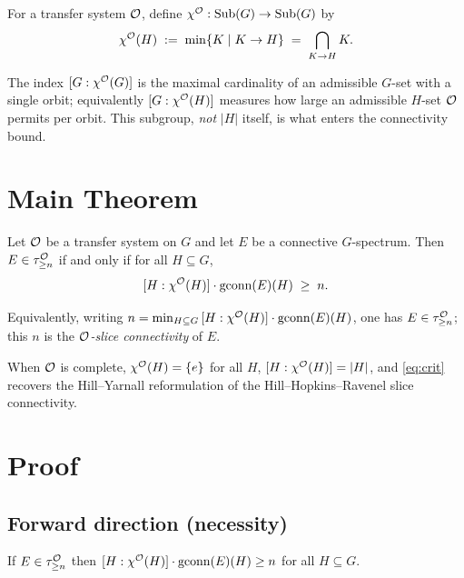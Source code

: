 \documentclass[11pt]{article}
\begin{document}
\begin{qfivedefinition}
For a transfer system $\mathcal{O}$, define $\chi^{\mathcal{O}}:\operatorname{Sub}(G)\to\operatorname{Sub}(G)$ by
\[
\chi^{\mathcal{O}}(H)\;:=\;\min\{K\mid K\to H\}\;=\;\bigcap_{K\to H}K .
\]
\end{qfivedefinition}

The index $[G:\chi^{\mathcal{O}}(G)]$ is the maximal cardinality of an admissible $G$-set
with a single orbit; equivalently $[G:\chi^{\mathcal{O}}(H)]$ measures how large an
admissible $H$-set $\mathcal{O}$ permits per orbit. This subgroup, \emph{not} $|H|$
itself, is what enters the connectivity bound.

\section*{Main Theorem}

\begin{qfivetheorem}\label{thm:main}
Let $\mathcal{O}$ be a transfer system on $G$ and let $E$ be a connective $G$-spectrum.
Then $E\in\tau^{\mathcal{O}}_{\ge n}$ if and only if for all $H\subseteq G$,
\begin{equation}\label{eq:crit}
[H:\chi^{\mathcal{O}}(H)]\cdot\operatorname{gconn}(E)(H)\;\ge\;n .
\end{equation}
\end{qfivetheorem}

Equivalently, writing
$n=\min_{H\subseteq G}\,[H:\chi^{\mathcal{O}}(H)]\cdot\operatorname{gconn}(E)(H)$, one has
$E\in\tau^{\mathcal{O}}_{\ge n}$; this $n$ is the \emph{$\mathcal{O}$-slice connectivity} of $E$.

When $\mathcal{O}$ is complete, $\chi^{\mathcal{O}}(H)=\{e\}$ for all $H$, $[H:\chi^{\mathcal{O}}(H)]=|H|$,
and \eqref{eq:crit} recovers the Hill--Yarnall reformulation \cite{HY18} of the
Hill--Hopkins--Ravenel slice connectivity.

\section*{Proof}

\subsection*{Forward direction (necessity)}

\begin{qfivelemma}\label{lem:forward}
If $E\in\tau^{\mathcal{O}}_{\ge n}$ then $[H:\chi^{\mathcal{O}}(H)]\cdot\operatorname{gconn}(E)(H)\ge n$ for all
$H\subseteq G$.
\end{qfivelemma}
\end{document}

